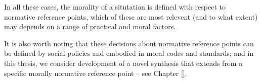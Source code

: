 
In all these cases, the morality of a situtation is defined with respect to normative reference points, which of these are most relevent (and to what extent) may depends on a range of practical and moral factors.

It is also worth noting that these decisions about normative reference points can be defined by social policies %
 and embodied in moral codes and standards; and in this thesis, we consider development of a novel synthesis that extends from a specific morally normative reference point -- see Chapter \ref{}. 





